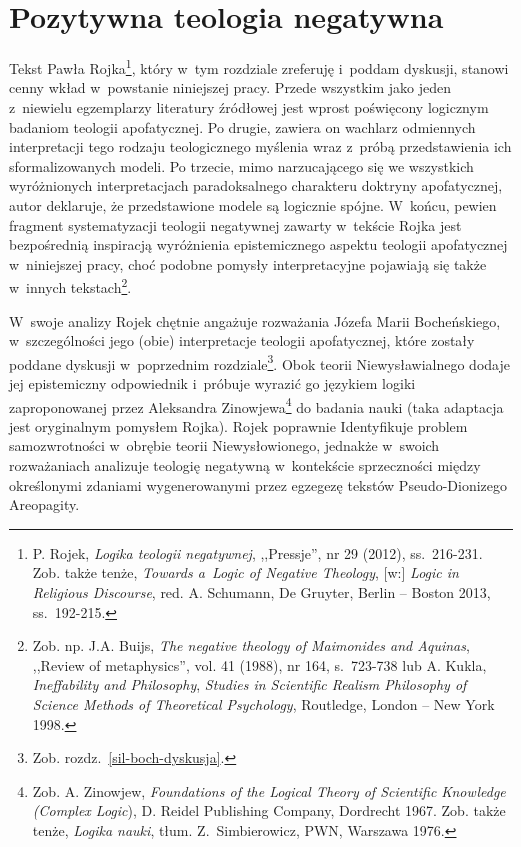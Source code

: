 \chapter{Pozytywna teologia negatywna}






Tekst Pawła Rojka\footnote{ P. Rojek, \textit{Logika teologii negatywnej}, ,,Pressje'', nr 29 (2012), ss.~216-231. Zob. także tenże, \textit{Towards a~Logic of Negative Theology}, [w:] \textit{Logic in Religious Discourse}, red. A. Schumann, De Gruyter, Berlin -- Boston 2013, ss.~192-215.}, który w~tym rozdziale zreferuję i~poddam dyskusji, stanowi cenny wkład w~powstanie niniejszej pracy. Przede wszystkim jako jeden z~niewielu egzemplarzy literatury źródłowej jest wprost poświęcony logicznym badaniom teologii apofatycznej. Po drugie, zawiera on wachlarz odmiennych interpretacji tego rodzaju teologicznego myślenia wraz z~próbą przedstawienia ich sformalizowanych modeli. Po trzecie, mimo narzucającego się we wszystkich wyróżnionych interpretacjach paradoksalnego charakteru doktryny apofatycznej, autor deklaruje, że przedstawione modele są logicznie spójne. W~końcu, pewien fragment systematyzacji teologii negatywnej zawarty w~tekście Rojka jest bezpośrednią inspiracją wyróżnienia epistemicznego aspektu teologii apofatycznej w~niniejszej pracy, choć podobne pomysły interpretacyjne pojawiają się także w~innych tekstach\footnote{ Zob. np. J.A. Buijs, \textit{The negative theology of Maimonides and Aquinas}, ,,Review of metaphysics'', vol. 41 (1988), nr 164, s.~723-738 lub A. Kukla, \textit{Ineffability and Philosophy}, \textit{Studies in Scientific Realism Philosophy of Science Methods of Theoretical Psychology}, Routledge, London -- New York 1998.}.

W~swoje analizy Rojek chętnie angażuje rozważania Józefa Marii Bocheńskiego, w~szczególności jego (obie) interpretacje teologii apofatycznej, które zostały poddane dyskusji w~poprzednim rozdziale\footnote{ Zob. rozdz.~\ref{sil-boch-dyskusja}.}. Obok teorii Niewysławialnego dodaje jej epistemiczny odpowiednik i~próbuje wyrazić go językiem logiki zaproponowanej przez Aleksandra Zinowjewa\footnote{ Zob. A. Zinowjew, \textit{Foundations of the Logical Theory of Scientific Knowledge (Complex Logic}), D. Reidel Publishing Company, Dordrecht 1967. Zob. także tenże, \textit{Logika nauki}, tłum. Z.~Simbierowicz, PWN, Warszawa 1976.} do badania nauki (taka adaptacja jest oryginalnym pomysłem Rojka). Rojek poprawnie Identyfikuje problem samozwrotności w~obrębie teorii Niewysłowionego, jednakże w~swoich rozważaniach analizuje teologię negatywną w~kontekście sprzeczności między określonymi zdaniami wygenerowanymi przez egzegezę tekstów Pseudo-Dionizego Areopagity.

